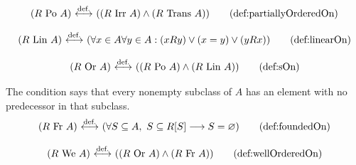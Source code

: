 \begin{definition}
\[
(R\mathrm{\ Po\ }A)\iffdef ((R\mathrm{\ Irr\ }A) \land (R\mathrm{\ Trans\ }A))
\labeltagd{def}{partiallyOrderedOn}
\]
\end{definition}
\begin{definition}
\[
(R\mathrm{\ Lin\ }A)\iffdef (\forall x\in A\forall y\in A:
(xRy) \lor (x=y) \lor (yRx))
\labeltagd{def}{linearOn}
\]
\end{definition}
\begin{definition}
\[
(R\mathrm{\ Or\ }A)\iffdef ((R\mathrm{\ Po\ }A) \land (R\mathrm{\ Lin\ }A))
\labeltagd{def}{sOn}
\]
\end{definition}
\begin{definition}
The condition says that every nonempty subclass of $A$ has an element with
no predecessor in that subclass.
\[
(R\mathrm{\ Fr\ }A)
\iffdef
(\forall S\subclass A,\ %
S\subclass R[S]
\implies
S=\emptyclass)
\labeltagd{def}{foundedOn}
\]
\end{definition}
\begin{definition}
\[
(R\mathrm{\ We\ }A)
\iffdef
((R\mathrm{\ Or\ }A) \land (R\mathrm{\ Fr\ }A))
\labeltagd{def}{wellOrderedOn}
\]
\end{definition}



